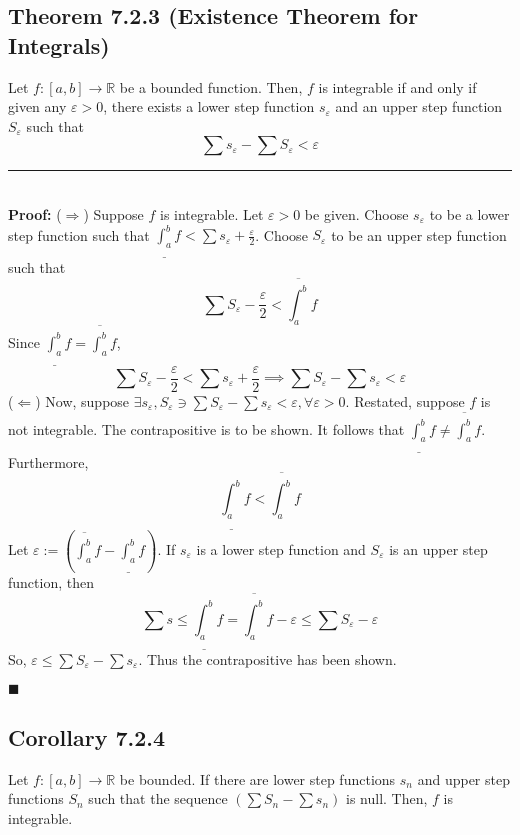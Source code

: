 \documentclass[11pt]{book}
\newcommand{\R}{\mathbb{R}}
\newcommand{\horline}{\noindent\rule{14.25cm}{0.6pt}\\}
\newcommand{\QED}{\begin{flushright}$\blacksquare$\end{flushright}}
\begin{document}
		\subsection{Theorem 7.2.3 (Existence Theorem for Integrals)}
		\label{subsec:theor723}
			\begin{theor}
				Let $f:[a,b] \to \R$ be a bounded function. Then, $f$ is integrable if and only if given any $\varepsilon > 0$, there exists a lower step function $s_{\varepsilon}$ and 
				an upper step function $S_{\varepsilon}$ such that $$\sum{s_{\varepsilon}} - \sum{S_{\varepsilon}} < \varepsilon$$
				\horline
				\textbf{Proof:}\hfill\break
				($\Rightarrow$) Suppose $f$ is integrable. Let $\varepsilon > 0$ be given. Choose $s_{\varepsilon}$ to be a lower step function such that $\underline{\int_a^b}{f} < 
				\sum{s_{\varepsilon} + \frac{\varepsilon}{2}}$. Choose $S_{\varepsilon}$ to be an upper step function such that 
				$$\sum{S_{\varepsilon}} - \frac{\varepsilon}{2} < \overline{\int_a^b}{f}$$
				Since $\underline{\int_a^b}{f} = \overline{\int_a^b}{f}$,
				$$\sum{S_{\varepsilon} - \frac{\varepsilon}{2}} < \sum{s_{\varepsilon} + \frac{\varepsilon}{2}} \implies \sum{S_{\varepsilon}} - \sum{s_{\varepsilon}} < \varepsilon$$
				($\Leftarrow$) Now, suppose $\exists s_{\varepsilon}, S_{\varepsilon} \ni \sum{S_{\varepsilon}} - \sum{s_{\varepsilon}} < \varepsilon, \forall \varepsilon > 0$. Restated, 
				suppose $f$ is not integrable. The contrapositive is to be shown. It follows that $\underline{\int_a^b}{f} \neq \overline{\int_a^b}{f}$. Furthermore,
				$$\underline{\int_a^b}{f} < \overline{\int_a^b}{f}$$
				Let $\varepsilon := (\overline{\int_a^b}{f} - \underline{\int_a^b}{f})$. If $s_{\varepsilon}$ is a lower step function and $S_{\varepsilon}$ is an upper step function, 
				then $$\sum{s} \leq \underline{\int_a^b}{f} = \overline{\int_a^b}{f} - \varepsilon \leq \sum{S_{\varepsilon}} - \varepsilon$$
				So, $\varepsilon \leq \sum{S_{\varepsilon}} - \sum{s_{\varepsilon}}$. Thus the contrapositive has been shown.
				\QED
			\end{theor}

		\subsection{Corollary 7.2.4}
		\label{subsec:cor724}
			\begin{cor}
				Let $f:[a,b] \to \R$ be bounded. If there are lower step functions $s_n$ and upper step functions $S_n$ such that the sequence $(\sum{S_n} - \sum{s_n})$ is null. Then, 
				$f$ is integrable.
			\end{cor}
\end{document}
